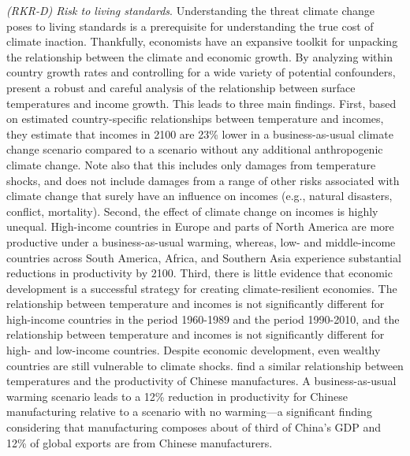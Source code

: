 \textit{(RKR-D) Risk to living standards}. Understanding the threat climate change poses to living standards is a prerequisite for understanding the true cost of climate inaction. Thankfully, economists have an expansive toolkit for unpacking the relationship between the climate and economic growth. By analyzing within country growth rates and controlling for a wide variety of potential confounders, \cite{burke2015global} present a robust and careful analysis of the relationship between surface temperatures and income growth. This leads to three main findings. First, based on estimated country-specific relationships between temperature and incomes, they estimate that incomes in 2100 are 23\% lower in a business-as-usual climate change scenario compared to a scenario without any additional anthropogenic climate change. Note also that this includes only damages from temperature shocks, and does not include damages from a range of other risks associated with climate change that surely have an influence on incomes (e.g., natural disasters, conflict, mortality). Second, the effect of climate change on incomes is highly unequal. High-income countries in Europe and parts of North America are more productive under a business-as-usual warming, whereas, low- and middle-income countries across South America, Africa, and Southern Asia experience substantial reductions in productivity by 2100. Third, there is little evidence that economic development is a successful strategy for creating climate-resilient economies. The relationship between temperature and incomes is not significantly different for high-income countries in the period 1960-1989 and the period 1990-2010, and the relationship between temperature and incomes is not significantly different for high- and low-income countries. Despite economic development, even wealthy countries are still vulnerable to climate shocks. \cite{zhang2018temperature} find a similar relationship between temperatures and the productivity of Chinese manufactures. A business-as-usual warming scenario leads to a 12\% reduction in productivity for Chinese manufacturing relative to a scenario with no warming---a significant finding considering that manufacturing composes about of third of China's GDP and 12\% of global exports are from Chinese manufacturers.

